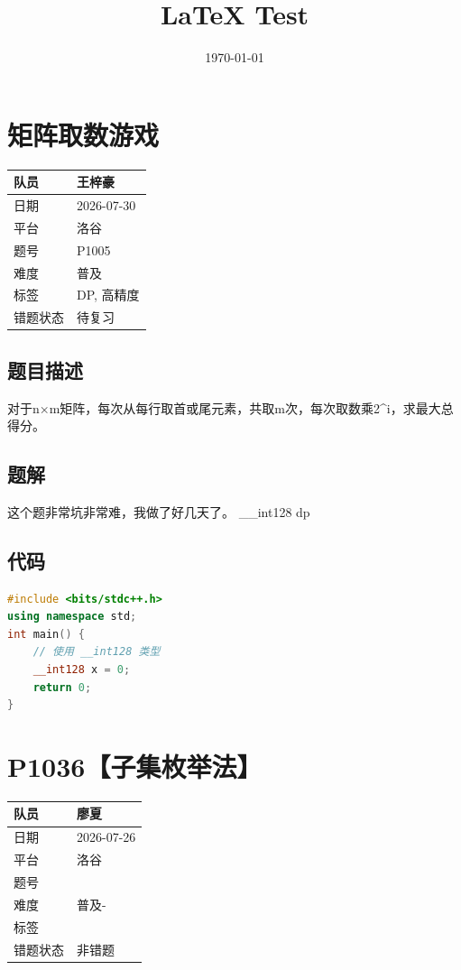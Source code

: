\documentclass[12pt,a4paper]{ctexart}
\title{LaTeX Test}
\date{\today}
\begin{document}
\maketitle
\tableofcontents
\newpage
\section{矩阵取数游戏}
\begin{tabular}{|l|l|}
\hline
队员 & 王梓豪 \\ \hline
日期 & 2026-07-30 \\ \hline
平台 & 洛谷 \\ \hline
题号 & P1005 \\ \hline
难度 & 普及 \\ \hline
标签 & DP, 高精度 \\ \hline
错题状态 & 待复习 \\ \hline
\end{tabular}

\subsection{题目描述}
对于n×m矩阵，每次从每行取首或尾元素，共取m次，每次取数乘2\^{}i，求最大总得分。

\subsection{题解}
这个题非常坑非常难，我做了好几天了。
\_\_int128
dp

\subsection{代码}
\begin{lstlisting}[language=C++]
#include <bits/stdc++.h>
using namespace std;
int main() {
    // 使用 __int128 类型
    __int128 x = 0;
    return 0;
}

\end{lstlisting}


\section{P1036【子集枚举法】}
\begin{tabular}{|l|l|}
\hline
队员 & 廖夏 \\ \hline
日期 & 2026-07-26 \\ \hline
平台 & 洛谷 \\ \hline
题号 &  \\ \hline
难度 & 普及- \\ \hline
标签 &  \\ \hline
错题状态 & 非错题 \\ \hline
\end{tabular}
\end{document}
